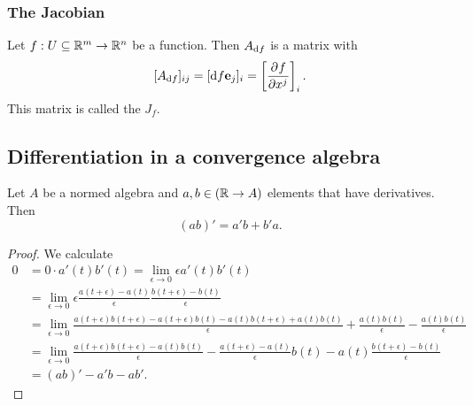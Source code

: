 \subsubsection{The Jacobian}
\begin{definition}
Let $f:U\subseteq\mathbb{R}^m\to\mathbb{R}^n$ be a function. Then $A_{\operatorname{d \!}{f}}$ is a matrix with
\[ [A_{\operatorname{d \!}{f}}]_{ij} = [\operatorname{d \!}{f}\boldsymbol{\mathrm{e}}_j]_i = \left[ \frac{\partial{^{}}f}{\partial{{x^j}^{}}} \right]_i. \]
This matrix is called the  $J_f$.
\end{definition}


\subsection{Differentiation in a convergence algebra}

\begin{proposition}
Let $A$ be a normed algebra and $a,b\in (\mathbb{R} \to A)$ elements that have derivatives. Then
\[ (ab)' = a'b + b'a. \]
\end{proposition}
\begin{proof}
We calculate
\begin{align*}
0 &= 0\cdot a'(t)b'(t) = \lim_{\epsilon \to 0} \epsilon a'(t)b'(t) \\
&= \lim_{\epsilon \to 0} \epsilon \frac{a(t+\epsilon) - a(t)}{\epsilon}\frac{b(t+\epsilon) - b(t)}{\epsilon} \\
&= \lim_{\epsilon \to 0}\frac{a(t+\epsilon)b(t+\epsilon) - a(t+\epsilon)b(t) - a(t)b(t+\epsilon) + a(t)b(t)}{\epsilon} + \frac{a(t)b(t)}{\epsilon} - \frac{a(t)b(t)}{\epsilon} \\
&= \lim_{\epsilon \to 0} \frac{a(t+\epsilon)b(t+\epsilon) - a(t)b(t)}{\epsilon} - \frac{a(t+\epsilon) - a(t)}{\epsilon}b(t) - a(t)\frac{b(t+\epsilon) - b(t)}{\epsilon} \\
&= (ab)' - a'b - ab'.
\end{align*}
\end{proof}

